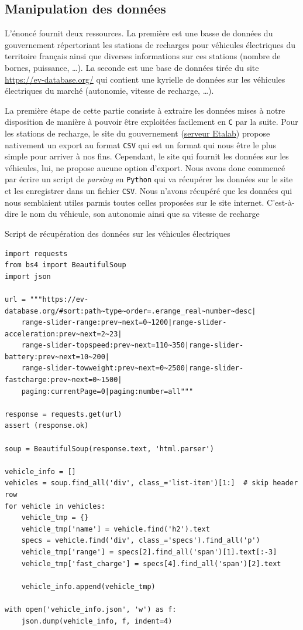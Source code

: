 \documentclass[a4paper, 12pt]{report}
\begin{document}
\subsection{Manipulation des données}
L'énoncé fournit deux ressources. La première est une basse de données du gouvernement répertoriant les stations de recharges pour véhicules électriques du territoire français ainsi que diverses informations sur ces stations (nombre de bornes, puissance, \dots). La seconde est une base de données tirée du site \url{https://ev-database.org/} qui contient une kyrielle de données sur les véhicules électriques du marché (autonomie, vitesse de recharge, \dots).\par\bigskip
La première étape de cette partie consiste à extraire les données mises à notre disposition de manière à pouvoir être exploitées facilement en \texttt{C} par la suite. Pour les stations de recharge, le site du gouvernement (\href{https://www.data.gouv.fr/fr/datasets/fichier-consolide-des-bornes-de-recharge-pour-vehicules-electriques/}{serveur Etalab}) propose nativement un export au format \texttt{CSV} qui est un format qui nous  être le plus simple pour arriver à nos fins. Cependant, le site qui fournit les données sur les véhicules, lui, ne propose aucune option d'export. Nous avons donc commencé par écrire un script de \textit{parsing} en \texttt{Python} qui va récupérer les données sur le site et les enregistrer dans un fichier \texttt{CSV}. Nous n'avons récupéré que les données qui nous semblaient utiles parmis toutes celles proposées sur le site internet. C'est-à-dire le nom du véhicule, son autonomie ainsi que sa vitesse de recharge\par\bigskip
\begin{longlisting}
    \caption{Script de récupération des données sur les véhicules électriques}
    \begin{verbatim}
import requests
from bs4 import BeautifulSoup
import json

url = """https://ev-database.org/#sort:path~type~order=.erange_real~number~desc|
    range-slider-range:prev~next=0~1200|range-slider-acceleration:prev~next=2~23|
    range-slider-topspeed:prev~next=110~350|range-slider-battery:prev~next=10~200|
    range-slider-towweight:prev~next=0~2500|range-slider-fastcharge:prev~next=0~1500|
    paging:currentPage=0|paging:number=all"""

response = requests.get(url)
assert (response.ok)

soup = BeautifulSoup(response.text, 'html.parser')

vehicle_info = []
vehicles = soup.find_all('div', class_='list-item')[1:]  # skip header row
for vehicle in vehicles:
    vehicle_tmp = {}
    vehicle_tmp['name'] = vehicle.find('h2').text
    specs = vehicle.find('div', class_='specs').find_all('p')
    vehicle_tmp['range'] = specs[2].find_all('span')[1].text[:-3]
    vehicle_tmp['fast_charge'] = specs[4].find_all('span')[2].text

    vehicle_info.append(vehicle_tmp)

with open('vehicle_info.json', 'w') as f:
    json.dump(vehicle_info, f, indent=4)
        \end{verbatim}
\end{longlisting}
\end{document}

